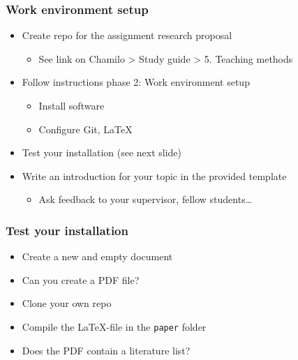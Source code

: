 \documentclass[aspectratio=169]{beamer}
\begin{document}
\begin{frame}
  \frametitle{Work environment setup}

  \begin{itemize}
    \item Create repo for the assignment research proposal
      \begin{itemize}
        \item See link on Chamilo > Study guide > 5. Teaching methods
      \end{itemize}
    \item Follow instructions phase 2: Work environment setup
      \begin{itemize}
        \item Install software
        \item Configure Git, \LaTeX
      \end{itemize}
    \item Test your installation (see next slide)
    \item Write an introduction for your topic in the provided template
      \begin{itemize}
        \item Ask feedback to your supervisor, fellow students\ldots
      \end{itemize}
  \end{itemize}
\end{frame}

\begin{frame}
  \frametitle{Test your installation}

  \begin{itemize}
    \item Create a new and empty document
    \item Can you create a PDF file?
    \item Clone your own repo
    \item Compile the {\LaTeX}-file in the \texttt{paper} folder
    \item Does the PDF contain a literature list?
  \end{itemize}
\end{frame}
\end{document}
